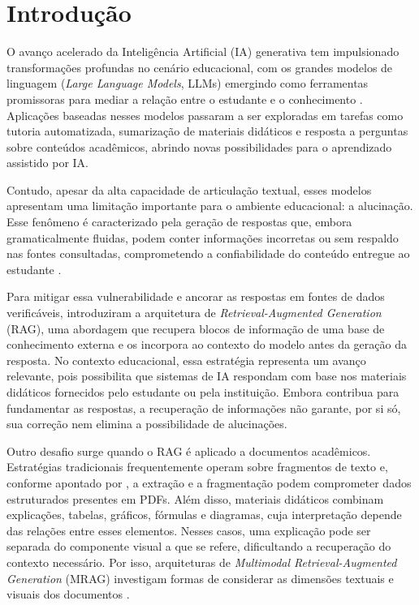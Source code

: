 \chapter{Introdução}
\label{cap:introducao}

O avanço acelerado da Inteligência Artificial (IA) generativa tem impulsionado transformações profundas no cenário educacional, com os grandes modelos de linguagem (\textit{Large Language Models}, LLMs) emergindo como ferramentas promissoras para mediar a relação entre o estudante e o conhecimento . Aplicações baseadas nesses modelos passaram a ser exploradas em tarefas como tutoria automatizada, sumarização de materiais didáticos e resposta a perguntas sobre conteúdos acadêmicos, abrindo novas possibilidades para o aprendizado assistido por IA.

Contudo, apesar da alta capacidade de articulação textual, esses modelos apresentam uma limitação importante para o ambiente educacional: a alucinação. Esse fenômeno é caracterizado pela geração de respostas que, embora gramaticalmente fluidas, podem conter informações incorretas ou sem respaldo nas fontes consultadas, comprometendo a confiabilidade do conteúdo entregue ao estudante .

Para mitigar essa vulnerabilidade e ancorar as respostas em fontes de dados verificáveis,  introduziram a arquitetura de \textit{Retrieval-Augmented Generation} (RAG), uma abordagem que recupera blocos de informação de uma base de conhecimento externa e os incorpora ao contexto do modelo antes da geração da resposta. No contexto educacional, essa estratégia representa um avanço relevante, pois possibilita que sistemas de IA respondam com base nos materiais didáticos fornecidos pelo estudante ou pela instituição. Embora contribua para fundamentar as respostas, a recuperação de informações não garante, por si só, sua correção nem elimina a possibilidade de alucinações.

Outro desafio surge quando o RAG é aplicado a documentos acadêmicos. Estratégias tradicionais frequentemente operam sobre fragmentos de texto e, conforme apontado por , a extração e a fragmentação podem comprometer dados estruturados presentes em PDFs. Além disso, materiais didáticos combinam explicações, tabelas, gráficos, fórmulas e diagramas, cuja interpretação depende das relações entre esses elementos. Nesses casos, uma explicação pode ser separada do componente visual a que se refere, dificultando a recuperação do contexto necessário. Por isso, arquiteturas de \textit{Multimodal Retrieval-Augmented Generation} (MRAG) investigam formas de considerar as dimensões textuais e visuais dos documentos .

